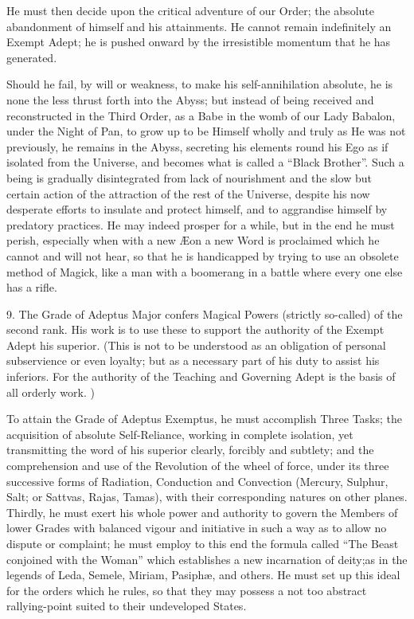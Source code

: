 He must then decide upon the critical adventure of our Order; the absolute abandonment of himself and his attainments. He cannot remain indefinitely an Exempt Adept; he is pushed onward by the irresistible momentum that he has generated.

Should he fail, by will or weakness, to make his self-annihilation absolute, he is none the less thrust forth into the Abyss; but instead of being received and reconstructed in the Third Order, as a Babe in the womb of our Lady Babalon, under the Night of Pan, to grow up to be Himself wholly and truly as He was not previously, he remains in the Abyss, secreting his elements round his Ego as if isolated from the Universe, and becomes what is called a \enquote{Black Brother}. Such a being is gradually disintegrated from lack of nourishment and the slow but certain action of the attraction of the rest of the Universe, despite his now desperate efforts to insulate and protect himself, and to aggrandise himself by predatory practices. He may indeed prosper for a while, but in the end he must perish, especially when with a new \AE{}on a new Word is proclaimed which he cannot and will not hear, so that he is handicapped by trying to use an obsolete method of Magick, like a man with a boomerang in a battle where every one else has a rifle.

\vspace{\baselineskip}

9. The Grade of Adeptus Major confers Magical Powers (strictly so-called) of the second rank. His work is to use these to support the authority of the Exempt Adept his superior. (This is not to be understood as an obligation of personal subservience or even loyalty; but as a necessary part of his duty to assist his inferiors. For the authority of the Teaching and Governing Adept is the basis of all orderly work. )

To attain the Grade of Adeptus Exemptus, he must accomplish Three Tasks; the acquisition of absolute Self-Reliance, working in complete isolation, yet transmitting the word of his superior clearly, forcibly and subtlety; and the comprehension and use of the Revolution of the wheel of force, under its three successive forms of Radiation, Conduction and Convection (Mercury, Sulphur, Salt; or Sattvas, Rajas, Tamas), with their corresponding natures on other planes. Thirdly, he must exert his whole power and authority to govern the Members of lower Grades with balanced vigour  and initiative in such a way as to allow no dispute or complaint; he must employ to this end the formula called \enquote{The Beast conjoined with the Woman} which establishes a new incarnation of deity;as in the legends of Leda, Semele, Miriam, Pasiph\ae{}, and others. He must set up this ideal for the orders which he rules, so that they may possess a not too abstract rallying-point suited to their undeveloped States.

